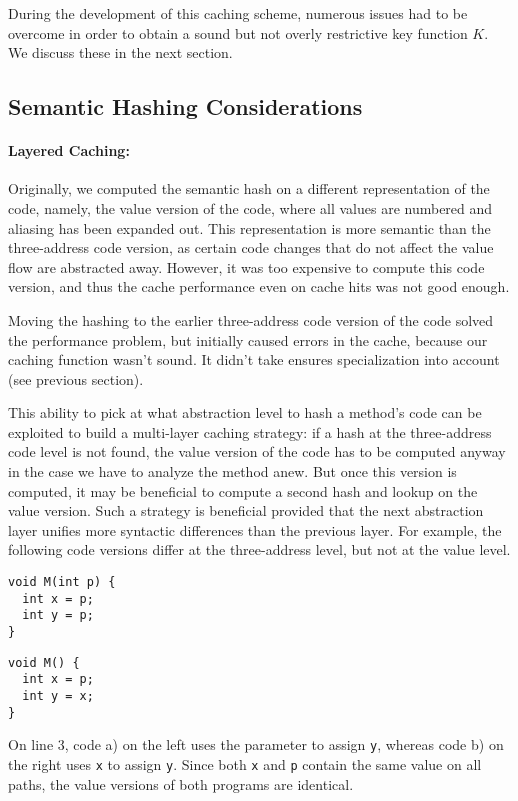 \documentclass{llncs}
\newcommand{\code}[1]{\lstinline{#1}}
\begin{document}
During the development of this caching scheme, numerous issues had to
be overcome in order to obtain a sound but not overly restrictive key
function $K$. We discuss these in the next section.


\subsection{Semantic Hashing Considerations}

\paragraph{Layered Caching:}
Originally, we computed the semantic hash on a different
representation of the code, namely, the value version of the
code, where all values are numbered and aliasing has been expanded
out. This representation is more semantic than the three-address code
version, as certain code changes that do not affect the value flow are
abstracted away. However, it was too expensive to compute this code
version, and thus the cache performance even on cache hits was not
good enough.

Moving the hashing to the earlier three-address code version of the
code solved the performance problem, but initially caused errors in
the cache, because our caching function wasn't sound. It didn't take
ensures specialization into account (see previous section).

This ability to pick at what abstraction level to hash a method's code
can be exploited to build a multi-layer caching strategy: if a hash at
the three-address code level is not found, the value
version of the code has to be computed anyway in the case we have to
analyze the method anew. But once this version is computed, it may be
beneficial to compute a second hash and lookup on the value
version. Such a strategy is beneficial provided that the next
abstraction layer unifies more syntactic differences than the previous
layer.  For example, the following code versions differ at the
three-address level, but not at the value level.
\begin{figure*}[h!]
\lstset{numbers=left, numberstyle=\tiny}
\begin{minipage}{.5\textwidth}
\begin{lstlisting}[caption={code a)},label=fig:semv1]
void M(int p) {
  int x = p;
  int y = p;
}
\end{lstlisting}
\end{minipage}
\begin{minipage}{.5\textwidth}
\begin{lstlisting}[caption={code b)},label=fig:semv2]
void M() {
  int x = p;
  int y = x;
}
\end{lstlisting}
\end{minipage}
\end{figure*}
On line 3, code a) on the left uses the parameter to assign \code{y},
whereas code b) on the right uses \code{x} to assign \code{y}. Since
both \code{x} and \code{p} contain the same value on all paths, the
value versions of both programs are identical.
\end{document}
